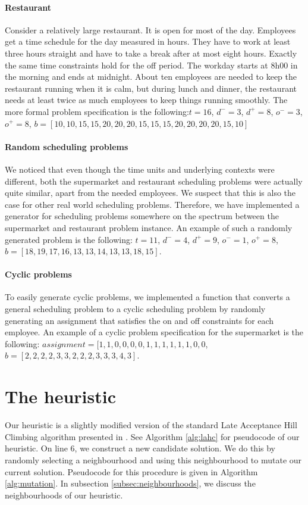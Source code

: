 \documentclass[]{article}
\begin{document}
\paragraph{Restaurant}
Consider a relatively large restaurant. It is open for most of the day. Employees get a time schedule for the day measured in hours. They have to work at least three hours straight and have to take a break after at most eight hours. Exactly the same time constraints hold for the off period. The workday starts at 8h00 in the morning and ends at midnight. About ten employees are needed to keep the restaurant running when it is calm, but during lunch and dinner, the restaurant needs at least twice as much employees to keep things running smoothly.
The more formal problem specification is the following:$t=16$, $d^- = 3$, $d^+ = 8$, $o^- = 3$, $o^+ = 8$, $b = [10,10,15,15,20,20,20,15,15,15,20,20,20,20,15,10]$

\paragraph{Random scheduling problems}
We noticed that even though the time units and underlying contexts were different, both the supermarket and restaurant scheduling problems were actually quite similar, apart from the needed employees. We suspect that this is also the case for other real world scheduling problems. Therefore, we have implemented a generator for scheduling problems somewhere on the spectrum between the supermarket and restaurant problem instance. An example of such a randomly generated problem is the following: $t=11$, $d^- = 4$, $d^+ = 9$, $o^- = 1$, $o^+ = 8$, $b = [18,19,17,16,13,13,14,13,13,18,15]$.

\paragraph{Cyclic problems}
To easily generate cyclic problems, we implemented a function that converts a general scheduling problem to a cyclic scheduling problem by randomly generating an assignment that satisfies the on and off constraints for each employee.
An example of a cyclic problem specification for the supermarket is the following:
$assignment = [1,1,0,0,0,0,1,1,1,1,1,1,0,0$, $b = [2,2,2,2,3,3,2,2,2,3,3,3,4,3]$.

\section{The heuristic}
Our heuristic is a slightly modified version of the standard Late Acceptance Hill Climbing algorithm presented in \cite{burke2012late}. See Algorithm \ref{alg:lahc} for pseudocode of our heuristic. On line 6, we construct a new candidate solution. We do this by randomly selecting a neighbourhood and using this neighbourhood to mutate our current solution. Pseudocode for this procedure is given in Algorithm \ref{alg:mutation}. In subsection \ref{subsec:neighbourhoods}, we discuss the neighbourhoods of our heuristic.
\end{document}
